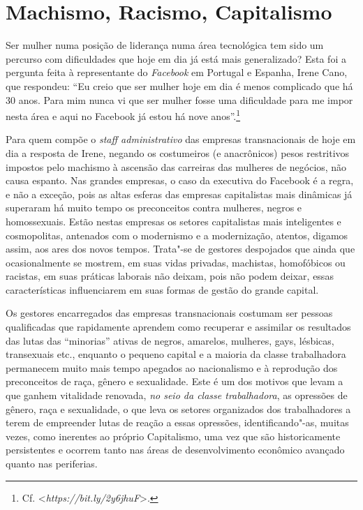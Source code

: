 \chapter{Machismo, Racismo, Capitalismo}

Ser mulher numa posição de liderança numa área tecnológica tem sido um
percurso com dificuldades que hoje em dia já está mais generalizado?
Esta foi a pergunta feita à representante do \emph{Facebook} em Portugal
e Espanha, Irene Cano, que respondeu: ``Eu creio que ser mulher hoje em
dia é menos complicado que há 30 anos. Para mim nunca vi que ser mulher
fosse uma dificuldade para me impor nesta área e aqui no Facebook já
estou há nove anos''.\footnote{Cf. \textless{}\emph{https://bit.ly/2y6jhuF}\textgreater{}.}

Para quem compõe o \emph{staff administrativo} das empresas
transnacionais de hoje em dia a resposta de Irene, negando os
costumeiros (e anacrônicos) pesos restritivos impostos pelo machismo à
ascensão das carreiras das mulheres de negócios, não causa espanto. Nas
grandes empresas, o caso da executiva do Facebook é a regra, e não a
exceção, pois as altas esferas das empresas capitalistas mais dinâmicas
já superaram há muito tempo os preconceitos contra mulheres, negros e
homossexuais. Estão nestas empresas os setores capitalistas mais
inteligentes e cosmopolitas, antenados com o modernismo e a
modernização, atentos, digamos assim, aos ares dos novos tempos.
Trata"-se de gestores despojados que ainda que ocasionalmente se mostrem,
em suas vidas privadas, machistas, homofóbicos ou racistas, em suas
práticas laborais não deixam, pois não podem deixar, essas
características influenciarem em suas formas de gestão do grande
capital.

Os gestores encarregados das empresas transnacionais costumam ser
pessoas qualificadas que rapidamente aprendem como recuperar e assimilar
os resultados das lutas das ``minorias'' ativas de negros, amarelos,
mulheres, gays, lésbicas, transexuais etc., enquanto o pequeno capital e
a maioria da classe trabalhadora permanecem muito mais tempo apegados ao
nacionalismo e à reprodução dos preconceitos de raça, gênero e
sexualidade. Este é um dos motivos que levam a que ganhem vitalidade
renovada, \emph{no seio da classe trabalhadora}, as opressões de gênero,
raça e sexualidade, o que leva os setores organizados dos trabalhadores
a terem de empreender lutas de reação a essas opressões,
identificando"-as, muitas vezes, como inerentes ao próprio Capitalismo,
uma vez que são historicamente persistentes e ocorrem tanto nas áreas de
desenvolvimento econômico avançado quanto nas periferias.

